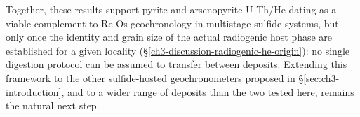 Together, these results support pyrite and arsenopyrite U-Th/He dating
as a viable complement to Re-Os geochronology in multistage sulfide
systems, but only once the identity and grain size of the actual
radiogenic host phase are established for a given locality
(\S\ref{ch3-discussion-radiogenic-he-origin}): no single digestion
protocol can be assumed to transfer between deposits. Extending this
framework to the other sulfide-hosted geochronometers proposed in
\S\ref{sec:ch3-introduction}, and to a wider range of deposits than the
two tested here, remains the natural next step.
